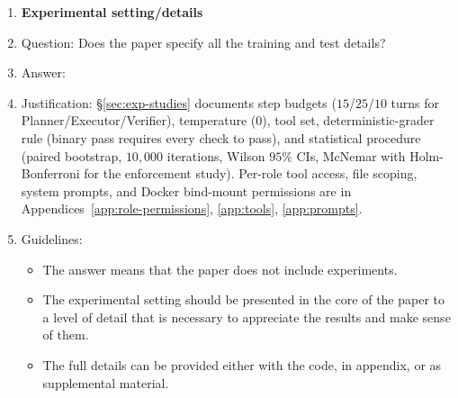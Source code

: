 \begin{enumerate}
\item {\bf Experimental setting/details}
    \item[] Question: Does the paper specify all the training and test details?
    \item[] Answer: \answerYes{}
    \item[] Justification: \S\ref{sec:exp-studies} documents step budgets ($15$/$25$/$10$ turns for Planner/Executor/Verifier), temperature ($0$), tool set, deterministic-grader rule (binary pass requires every check to pass), and statistical procedure (paired bootstrap, $10{,}000$ iterations, Wilson $95\%$ CIs, McNemar with Holm-Bonferroni for the enforcement study). Per-role tool access, file scoping, system prompts, and Docker bind-mount permissions are in Appendices~\ref{app:role-permissions}, \ref{app:tools}, \ref{app:prompts}.
    \item[] Guidelines:
    \begin{itemize}
        \item The answer \answerNA{} means that the paper does not include experiments.
        \item The experimental setting should be presented in the core of the paper to a level of detail that is necessary to appreciate the results and make sense of them.
        \item The full details can be provided either with the code, in appendix, or as supplemental material.
    \end{itemize}


\end{enumerate}
